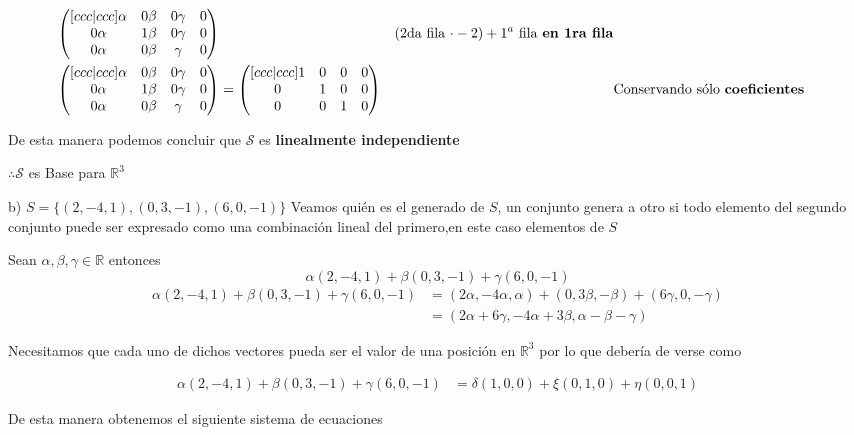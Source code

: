\documentclass[letterpaper]{article}
\newcommand{\R}{\mathds{R}}
\renewcommand{\*}{\cdot}
\theoremstyle{definition}
\begin{document}
\begin{align*}
\begin{pmatrix}[ccc|ccc]
		\alpha & 0\beta & 0\gamma & 0\\
		0\alpha & 1\beta & 0\gamma& 0\\
		0\alpha & 0\beta & \gamma & 0
		\end{pmatrix} && \text{(2da fila $ \* -2) + 1^{a} $ fila \textbf{en 1ra fila}}\\
		\begin{pmatrix}[ccc|ccc]
		\alpha & 0\beta & 0\gamma & 0\\
		0\alpha & 1\beta & 0\gamma& 0\\
		0\alpha & 0\beta & \gamma &0
		\end{pmatrix} & = \begin{pmatrix}[ccc|ccc]
		1 & 0 & 0 &0\\
		0 & 1 & 0& 0\\
		0 & 0 & 1 & 0
		\end{pmatrix} && \text{Conservando sólo \textbf{coeficientes}}
		\end{align*}
		
		De esta manera podemos concluir que $ \mathcal{S} $ es \textbf{linealmente independiente} 
		\begin{center}
			$ \therefore \mathcal{S} $ es Base para $ \R^3 $ 
		\end{center}
	b) $S = \lbrace (2,-4,1),(0,3,-1),(6,0,-1) \rbrace$
	Veamos quién es el generado de $ S $, un conjunto genera a otro si todo elemento del segundo conjunto puede ser expresado como una combinación lineal del primero,en este caso elementos de $ S $
	
	Sean $ \alpha, \beta, \gamma  \in \R$ entonces 
	\[\alpha(2,-4,1) + \beta(0,3,-1) + \gamma(6,0,-1)  \]
	\begin{align*}
		\alpha(2,-4,1) + \beta(0,3,-1) + \gamma(6,0,-1)  &= (2\alpha, -4\alpha, \alpha) + (0, 3\beta, -\beta) + (6\gamma, 0, -\gamma)\\
		&= (2\alpha + 6\gamma, -4\alpha + 3\beta, \alpha - \beta - \gamma)
	\end{align*}
	
	Necesitamos que cada uno de dichos vectores pueda ser el valor de una posición en $ \R^3 $ por lo que debería de verse como
	
	\begin{align*}
	\alpha(2,-4,1) + \beta(0,3,-1) + \gamma(6,0,-1)  &= \delta(1,0,0) + \xi(0, 1, 0) + \eta(0,0,1)
	\end{align*}	
	
	De esta manera obtenemos el siguiente sistema de ecuaciones
	
\end{document}
